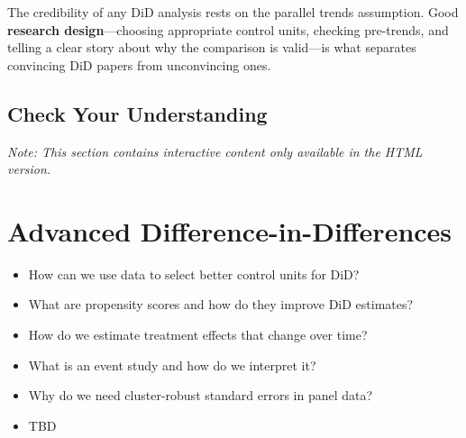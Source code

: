 \documentclass[
  letterpaper,
  DIV=11,
  numbers=noendperiod]{scrreprt}
\providecommand{\tightlist}{%
  \setlength{\itemsep}{0pt}\setlength{\parskip}{0pt}}
\begin{document}
The credibility of any DiD analysis rests on the parallel trends
assumption. Good \textbf{research design}---choosing appropriate control
units, checking pre-trends, and telling a clear story about why the
comparison is valid---is what separates convincing DiD papers from
unconvincing ones.

\section{Check Your Understanding}\label{check-your-understanding-10}

\emph{Note: This section contains interactive content only available in
the HTML version.}


\chapter{Advanced Difference-in-Differences}\label{sec-advanced-did}

\begin{tcolorbox}[enhanced jigsaw, arc=.35mm, bottomrule=.15mm, bottomtitle=1mm, breakable, colback=white, colbacktitle=quarto-callout-tip-color!10!white, colframe=quarto-callout-tip-color-frame, coltitle=black, left=2mm, leftrule=.75mm, opacityback=0, opacitybacktitle=0.6, rightrule=.15mm, title=\textcolor{quarto-callout-tip-color}{\faLightbulb}\hspace{0.5em}{\textbf{Key Questions}}, titlerule=0mm, toprule=.15mm, toptitle=1mm]

\begin{itemize}
\tightlist
\item
  How can we use data to select better control units for DiD?
\item
  What are propensity scores and how do they improve DiD estimates?
\item
  How do we estimate treatment effects that change over time?
\item
  What is an event study and how do we interpret it?
\item
  Why do we need cluster-robust standard errors in panel data?
\end{itemize}

\end{tcolorbox}

\begin{tcolorbox}[enhanced jigsaw, arc=.35mm, bottomrule=.15mm, bottomtitle=1mm, breakable, colback=white, colbacktitle=quarto-callout-note-color!10!white, colframe=quarto-callout-note-color-frame, coltitle=black, left=2mm, leftrule=.75mm, opacityback=0, opacitybacktitle=0.6, rightrule=.15mm, title=\textcolor{quarto-callout-note-color}{\faInfo}\hspace{0.5em}{\textbf{Suggested Readings}}, titlerule=0mm, toprule=.15mm, toptitle=1mm]

\begin{itemize}
\tightlist
\item
  TBD
\end{itemize}

\end{tcolorbox}
\end{document}
